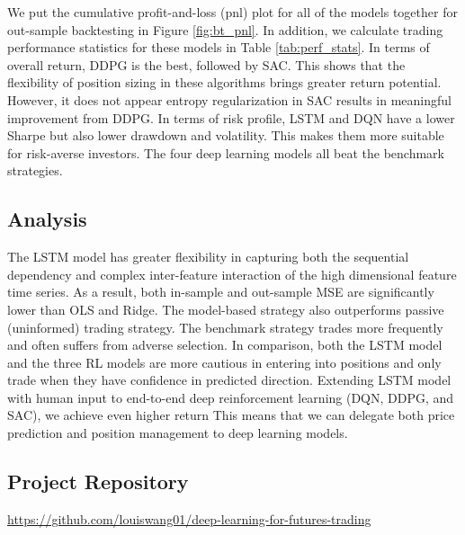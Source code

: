 \documentclass{article}
\begin{document}
We put the cumulative profit-and-loss (pnl) plot for all of the models together for out-sample backtesting in Figure \ref{fig:bt_pnl}. In addition, we calculate trading performance statistics for these models in Table \ref{tab:perf_stats}. In terms of overall return, DDPG is the best, followed by SAC. This shows that the flexibility of position sizing in these algorithms brings greater return potential. However, it does not appear entropy regularization in SAC results in meaningful improvement from DDPG. In terms of risk profile, LSTM and DQN have a lower Sharpe but also lower drawdown and volatility. This makes them more suitable for risk-averse investors. The four deep learning models all beat the benchmark strategies.

\subsection{Analysis}

The LSTM model has greater flexibility in capturing both the sequential dependency and complex inter-feature interaction of the high dimensional feature time series. As a result, both in-sample and out-sample MSE are significantly lower than OLS and Ridge. The model-based strategy also outperforms passive (uninformed) trading strategy. The benchmark strategy trades more frequently and often suffers from adverse selection. In comparison, both the LSTM model and the three RL models are more cautious in entering into positions and only trade when they have confidence in predicted direction. Extending LSTM model with human input to end-to-end deep reinforcement learning (DQN, DDPG, and SAC), we achieve even higher return This means that we can delegate both price prediction and position management to deep learning models. 

\subsection{Project Repository}
\href{https://github.com/louiswang01/deep-learning-for-futures-trading}{https://github.com/louiswang01/deep-learning-for-futures-trading}



\end{document}
